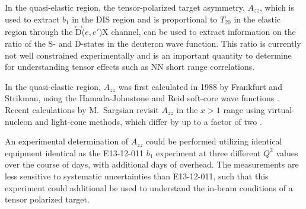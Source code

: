 

In the quasi-elastic region, the tensor-polarized target asymmetry, $A_{zz}$, which is used to extract $b_1$ in the DIS region and is proportional to $T_{20}$ in the elastic region through the $\stackrel{\leftrightarrow}{\mathrm{D}}$($e,e'$)X channel, can be used to extract information on the ratio of the S- and D-states in the deuteron wave function. This ratio is currently not well constrained experimentally and is an important quantity to determine for understanding tensor effects such as NN short range correlations.

In the quasi-elastic region, $A_{zz}$ was first calculated in 1988 by Frankfurt and Strikman, using the Hamada-Johnstone and Reid soft-core wave functions \cite{Frankfurt:1988nt}. Recent calculations by {M.~Sargsian} revisit $A_{zz}$ in the $x>1$ range using virtual-nucleon and light-cone methods, which differ by up to a factor of two \cite{MISAK}.

An experimental determination of $A_{zz}$ could be performed utilizing identical equipment identical as the E13-12-011 $b_1$ experiment at three different $Q^2$ values over the course of \productiondays days, with \overheaddays additional days of overhead. The measurements are less sensitive to systematic uncertainties than E13-12-011, such that this experiment could additional be used to understand the in-beam conditions of a tensor polarized target.